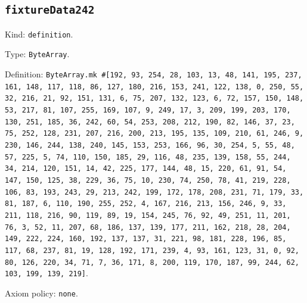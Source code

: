 \documentclass[11pt]{article}
\begin{document}
\subsection*{\texttt{fixtureData242}}
\noindent Kind: \texttt{definition}.\par
\noindent Type: \texttt{ByteArray}.\par
\noindent Definition: \texttt{ByteArray.mk \#[192, 93, 254, 28, 103, 13, 48, 141, 195, 237, 161, 148, 117, 118, 86, 127, 180, 216, 153, 241, 122, 138, 0, 250, 55, 32, 216, 21, 92, 151, 131, 6, 75, 207, 132, 123, 6, 72, 157, 150, 148, 53, 217, 81, 107, 255, 169, 107, 9, 249, 17, 3, 209, 199, 203, 170, 130, 251, 185, 36, 242, 60, 54, 253, 208, 212, 190, 82, 146, 37, 23, 75, 252, 128, 231, 207, 216, 200, 213, 195, 135, 109, 210, 61, 246, 9, 230, 146, 244, 138, 240, 145, 153, 253, 166, 96, 30, 254, 5, 55, 48, 57, 225, 5, 74, 110, 150, 185, 29, 116, 48, 235, 139, 158, 55, 244, 34, 214, 120, 151, 14, 42, 225, 177, 144, 48, 15, 220, 61, 91, 54, 147, 150, 125, 38, 229, 36, 75, 10, 230, 74, 250, 78, 41, 219, 228, 106, 83, 193, 243, 29, 213, 242, 199, 172, 178, 208, 231, 71, 179, 33, 81, 187, 6, 110, 190, 255, 252, 4, 167, 216, 213, 156, 246, 9, 33, 211, 118, 216, 90, 119, 89, 19, 154, 245, 76, 92, 49, 251, 11, 201, 76, 3, 52, 11, 207, 68, 186, 137, 139, 177, 211, 162, 218, 28, 204, 149, 222, 224, 160, 192, 137, 137, 31, 221, 98, 181, 228, 196, 85, 117, 68, 237, 81, 19, 128, 192, 171, 239, 4, 93, 161, 123, 31, 0, 92, 80, 126, 220, 34, 71, 7, 36, 171, 8, 200, 119, 170, 187, 99, 244, 62, 103, 199, 139, 219]}.\par
\noindent Axiom policy: \texttt{none}.\par
\end{document}
